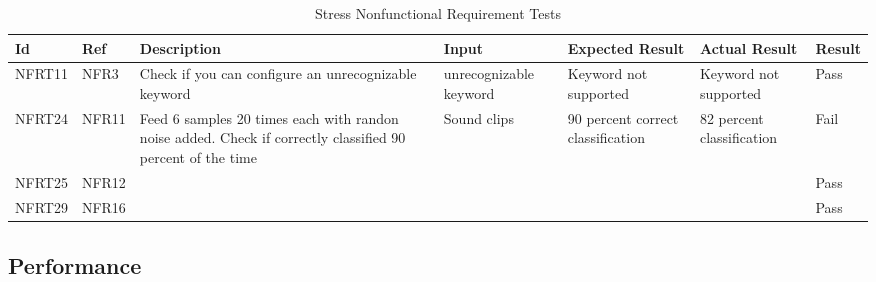 \documentclass[12pt, titlepage]{article}
\begin{document}
\begin{longtable}{|p{1.4cm}|p{1.4cm}|p{3cm}|p{1.5cm}|p{2.5cm}|p{2cm}|p{1.2cm}|}
  \caption{Stress Nonfunctional Requirement Tests}
  \label{stressNonfunctionalRequirementTests}
  \endfirsthead
  \endhead
  \hline
  \textbf{Id} & \textbf{Ref} & \textbf{Description}                                                         & \textbf{Input}                                    & \textbf{Expected Result}    & \textbf{Actual Result}                          & \textbf{Result}                                     \\ \hline
  NFRT11        & NFR3          & Check if you can configure an unrecognizable keyword              & unrecognizable keyword                          & Keyword not supported                      & Keyword not supported                         & {\color[HTML]{32CB00} Pass}                         \\ \hline
  NFRT24        & NFR11         & Feed 6 samples 20 times each with randon noise added. Check if correctly classified 90 percent of the time           & Sound clips   & 90 percent correct classification        & 82 percent classification     & {\color[HTML]{FE0000} Fail}                           \\ \hline
  NFRT25        & NFR12         &         &   &                   &                     & {\color[HTML]{32CB00} Pass}                         \\ \hline
  NFRT29        & NFR16         & &  & &         & {\color[HTML]{32CB00} Pass}                         \\ \hline
\end{longtable}

\subsection{Performance}
\end{document}
